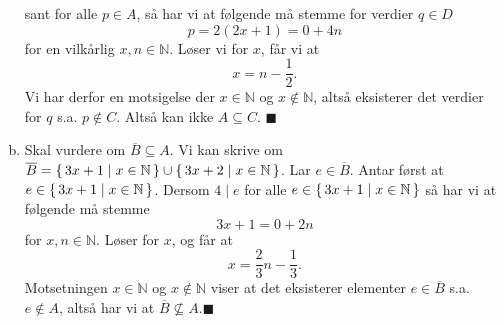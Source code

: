 \documentclass{article}
\begin{document}
\begin{enumerate}[(a)]
{        sant for alle $p \in A$, så har vi at følgende må stemme for verdier $q \in D$
        $$p = 2(2x + 1) = 0 + 4n$$
        for en vilkårlig $x, n \in \mathbb{N}$. Løser vi for $x$, får vi at
        $$x = n - \frac{1}{2}\text{.}$$
        Vi har derfor en motsigelse der $x \in \mathbb{N}$ og $x \notin \mathbb{N}$, altså eksisterer det verdier for 
        $q$ s.a. $p \notin C$. Altså kan ikke $A \subseteq C$. $\blacksquare$
    }
    \item {
        Skal vurdere om $\overline{B} \subseteq A$. Vi kan skrive om $\overline{B} = \set{3x + 1 \mid x \in \mathbb{N}} \cup \set{3x + 2 \mid x \in \mathbb{N}}$.
        Lar $e \in \overline{B}$. Antar først at $e \in \set{3x + 1 \mid x \in \mathbb{N}}$. Dersom $4 \mid e$ for alle $e \in \set{3x + 1 \mid x \in \mathbb{N}}$
        så har vi at følgende må stemme 
        $$3x + 1 = 0 + 2n$$
        for $x, n \in \mathbb{N}$. Løser for $x$, og får at 
        $$x = \frac{2}{3}n - \frac{1}{3}\text{.}$$
        Motsetningen $x \in \mathbb{N}$ og $x \notin \mathbb{N}$ viser at det eksisterer elementer $e \in \overline{B}$ s.a. $e \notin A$, altså 
        har vi at $\overline{B} \not\subseteq A$.$\blacksquare$
    }
\end{enumerate}
\end{document}
